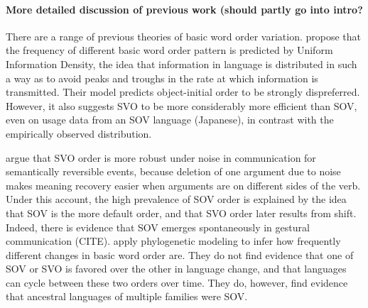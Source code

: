 \documentclass[11pt,a4paper]{article}
\begin{document}
\paragraph{More detailed discussion of previous work (should partly go into intro?}
There are a range of previous theories of basic word order variation.
\cite{maurits2010why} propose that the frequency of different basic word order pattern is predicted by Uniform Information Density, the idea that information in language is distributed in such a way as to avoid peaks and troughs in the rate at which information is transmitted.
Their model predicts object-initial order to be strongly dispreferred.
However, it also suggests SVO to be more considerably more efficient than SOV, even on usage data from an SOV language (Japanese), in contrast with the empirically observed distribution.

\cite{gibson-noisy-channel-2013} argue that SVO order is more robust under noise in communication for semantically reversible events, because deletion of one argument due to noise makes meaning recovery easier when arguments are on different sides of the verb.
Under this account, the high prevalence of SOV order is explained by the idea that SOV is the more default order, and that SVO order later results from shift.
Indeed, there is evidence that SOV emerges spontaneously in gestural communication (CITE).
\cite{maurits2014tracing} apply phylogenetic modeling to infer how frequently different changes in basic word order are.
They do not find evidence that one of SOV or SVO is favored over the other in language change, and that languages can cycle between these two orders over time.
They do, however, find evidence that ancestral languages of multiple families were SOV.
\end{document}

